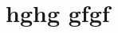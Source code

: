 \documentclass[conference]{../../setup/IEEEtran}
\title[Social privacy score throhghugh vulnerability contagion process]
\author[Aghiles DJOUDI, Guy PUJOLLE\\ \textsf{Sorbonne University} \\ \textsf{4 Place Jussieu, 75005 Paris, France} \\ \textsf{firstname.lastname@upmc.fr}]
\let\oldsection\section
\renewcommand{\section}[1][]{%
\oldsection{#1}
}
\begin{document}
\maketitle




\section[hghg gfgf]


%
%
%
%
%
%

\printbibliography
\end{document}
